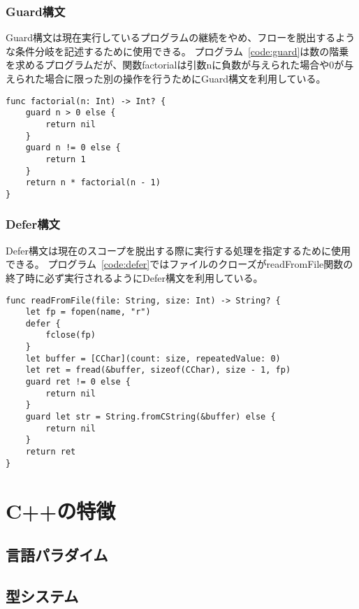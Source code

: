 \subsubsection{Guard構文}

Guard構文は現在実行しているプログラムの継続をやめ、フローを脱出するような条件分岐を記述するために使用できる。
プログラム~\ref{code:guard}は数の階乗を求めるプログラムだが、関数factorialは引数nに負数が与えられた場合や0が与えられた場合に限った別の操作を行うためにGuard構文を利用している。

\begin{lstlisting}[caption=Guard制御構文, label=code:guard]
func factorial(n: Int) -> Int? {
    guard n > 0 else {
        return nil
    }
    guard n != 0 else {
        return 1
    }
    return n * factorial(n - 1)
}
\end{lstlisting}

\subsubsection{Defer構文}

Defer構文は現在のスコープを脱出する際に実行する処理を指定するために使用できる。
プログラム~\ref{code:defer}ではファイルのクローズがreadFromFile関数の終了時に必ず実行されるようにDefer構文を利用している。

\begin{lstlisting}[caption=Guard制御構文, label=code:guard]
func readFromFile(file: String, size: Int) -> String? {
    let fp = fopen(name, "r")
    defer {
        fclose(fp)
    }
    let buffer = [CChar](count: size, repeatedValue: 0)
    let ret = fread(&buffer, sizeof(CChar), size - 1, fp)
    guard ret != 0 else {
        return nil
    }
    guard let str = String.fromCString(&buffer) else {
        return nil
    }
    return ret
}
\end{lstlisting}


\section{C++の特徴}

\subsection{言語パラダイム}

\subsection{型システム}

